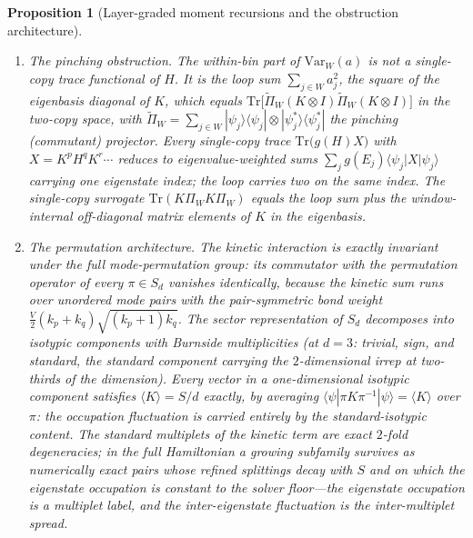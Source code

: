\documentclass[11pt,a4paper]{article}
\theoremstyle{plain}
\newtheorem{proposition}[theorem]{Proposition}
\theoremstyle{definition}
\theoremstyle{remark}
\begin{document}
\begin{proposition}[Layer-graded moment recursions and the obstruction
architecture]
\begin{enumerate}[leftmargin=1.6em]
and $\mathrm{Var}_{W}(a)$ dominates its between-bin part
$\mathrm{Var}_{\mathrm{bins}}\bigl(\bar a_b\bigr)$, which is itself a
trace functional (per-bin window masses and first moments).
\item \emph{The pinching obstruction.} The within-bin part of
$\mathrm{Var}_{W}(a)$ is not a single-copy trace functional of $H$. It is
the loop sum $\sum_{j\in W}a_j^{2}$, the square of the eigenbasis diagonal
of $K$, which equals
$\mathrm{Tr}\bigl[\widetilde{\Pi}_{W}(K\otimes I)\widetilde{\Pi}_{W}
(K\otimes I)\bigr]$ in the two-copy space, with
$\widetilde{\Pi}_{W}=\sum_{j\in W}|\psi_j\rangle\langle\psi_j|\otimes
|\psi_j^{*}\rangle\langle\psi_j^{*}|$ the pinching (commutant) projector.
Every single-copy trace $\mathrm{Tr}\bigl(g(H)X\bigr)$ with
$X=K^{p}H^{q}K^{r}\cdots$ reduces to eigenvalue-weighted sums
$\sum_j g(E_j)\langle\psi_j|X|\psi_j\rangle$ carrying one eigenstate
index; the loop carries two on the same index. The single-copy surrogate
$\mathrm{Tr}(K\Pi_WK\Pi_W)$ equals the loop sum plus the window-internal
off-diagonal matrix elements of $K$ in the eigenbasis.
\item \emph{The permutation architecture.} The kinetic interaction is
exactly invariant under the full mode-permutation group: its commutator
with the permutation operator of every $\pi\in S_d$ vanishes identically,
because the kinetic sum runs over unordered mode pairs with the
pair-symmetric bond weight $\tfrac{V}{2}(k_p+k_q)\sqrt{(k_p+1)k_q}$. The
sector representation of $S_d$ decomposes into isotypic components with
Burnside multiplicities (at $d=3$: trivial, sign, and standard, the
standard component carrying the $2$-dimensional irrep at
two-thirds of the dimension). Every vector in a one-dimensional isotypic
component satisfies $\langle K\rangle=S/d$ exactly, by averaging
$\langle\psi|\pi K\pi^{-1}|\psi\rangle=\langle K\rangle$ over $\pi$: the
occupation fluctuation is carried entirely by the standard-isotypic
content. The standard multiplets of the kinetic term are exact
$2$-fold degeneracies; in the full Hamiltonian a growing subfamily
survives as numerically exact pairs whose refined splittings decay with
$S$ and on which the eigenstate occupation is constant to the solver
floor---the eigenstate occupation is a multiplet label, and the
inter-eigenstate fluctuation is the inter-multiplet spread.
\end{enumerate}
\end{proposition}
\end{document}
